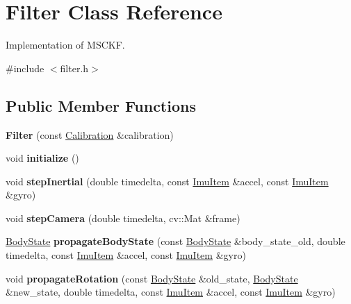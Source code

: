 \hypertarget{class_filter}{\section{Filter Class Reference}
\label{class_filter}
}


Implementation of M\-S\-C\-K\-F.  




{\ttfamily \#include $<$filter.\-h$>$}

\subsection*{Public Member Functions}
\begin{DoxyCompactItemize}
\item 
\hypertarget{class_filter_ac00d9ce620e60b2c8b26ca9cad7e1b39}{{\bfseries Filter} (const \hyperlink{class_calibration}{Calibration} \&calibration)}\label{class_filter_ac00d9ce620e60b2c8b26ca9cad7e1b39}

\item 
\hypertarget{class_filter_a5742b1247b9f92a9148d99386cdd3876}{void {\bfseries initialize} ()}\label{class_filter_a5742b1247b9f92a9148d99386cdd3876}

\item 
\hypertarget{class_filter_a27176eb65976f98cdc9495b4fdfc3296}{void {\bfseries step\-Inertial} (double timedelta, const \hyperlink{class_imu_item}{Imu\-Item} \&accel, const \hyperlink{class_imu_item}{Imu\-Item} \&gyro)}\label{class_filter_a27176eb65976f98cdc9495b4fdfc3296}

\item 
\hypertarget{class_filter_aa28ba41a7503afe19bdcc2a8b85f6adc}{void {\bfseries step\-Camera} (double timedelta, cv\-::\-Mat \&frame)}\label{class_filter_aa28ba41a7503afe19bdcc2a8b85f6adc}

\item 
\hypertarget{class_filter_a2767a830213940f97fad6c472684598d}{\hyperlink{class_body_state}{Body\-State} {\bfseries propagate\-Body\-State} (const \hyperlink{class_body_state}{Body\-State} \&body\-\_\-state\-\_\-old, double timedelta, const \hyperlink{class_imu_item}{Imu\-Item} \&accel, const \hyperlink{class_imu_item}{Imu\-Item} \&gyro)}\label{class_filter_a2767a830213940f97fad6c472684598d}

\item 
\hypertarget{class_filter_ac5c7f21b6a486de46946e296affb00b4}{void {\bfseries propagate\-Rotation} (const \hyperlink{class_body_state}{Body\-State} \&old\-\_\-state, \hyperlink{class_body_state}{Body\-State} \&new\-\_\-state, double timedelta, const \hyperlink{class_imu_item}{Imu\-Item} \&accel, const \hyperlink{class_imu_item}{Imu\-Item} \&gyro)}\label{class_filter_ac5c7f21b6a486de46946e296affb00b4}


\end{DoxyCompactItemize}
